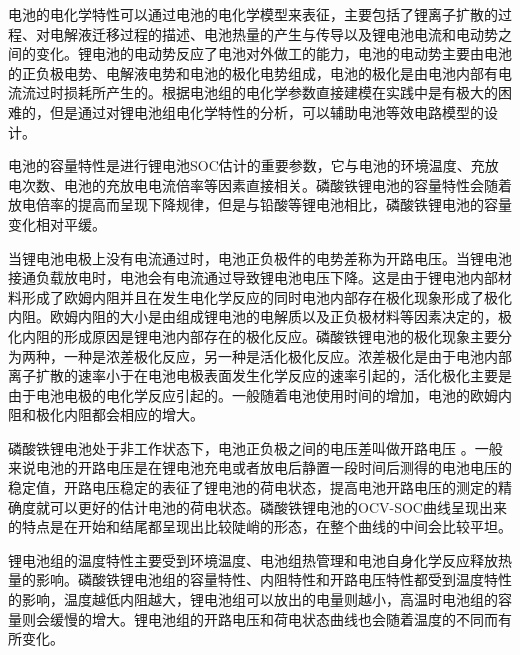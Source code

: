 	电池的电化学特性可以通过电池的电化学模型来表征，主要包括了锂离子扩散的过程、对电解液迁移过程的描述、电池热量的产生与传导以及锂电池电流和电动势之间的变化。锂电池的电动势反应了电池对外做工的能力，电池的电动势主要由电池的正负极电势、电解液电势和电池的极化电势组成，电池的极化是由电池内部有电流流过时损耗所产生的。根据电池组的电化学参数直接建模在实践中是有极大的困难的，但是通过对锂电池组电化学特性的分析，可以辅助电池等效电路模型的设计。
\begin{enumerate}

	电池的容量特性是进行锂电池SOC估计的重要参数，它与电池的环境温度、充放电次数、电池的充放电电流倍率等因素直接相关。磷酸铁锂电池的容量特性会随着放电倍率的提高而呈现下降规律，但是与铅酸等锂电池相比，磷酸铁锂电池的容量变化相对平缓。

	当锂电池电极上没有电流通过时，电池正负极件的电势差称为开路电压。当锂电池接通负载放电时，电池会有电流通过导致锂电池电压下降。这是由于锂电池内部材料形成了欧姆内阻并且在发生电化学反应的同时电池内部存在极化现象形成了极化内阻。欧姆内阻的大小是由组成锂电池的电解质以及正负极材料等因素决定的，极化内阻的形成原因是锂电池内部存在的极化反应。磷酸铁锂电池的极化现象主要分为两种，一种是浓差极化反应，另一种是活化极化反应。浓差极化是由于电池内部 离子扩散的速率小于在电池电极表面发生化学反应的速率引起的，活化极化主要是由于电池电极的电化学反应引起的。一般随着电池使用时间的增加，电池的欧姆内阻和极化内阻都会相应的增大。

	磷酸铁锂电池处于非工作状态下，电池正负极之间的电压差叫做开路电压 。一般来说电池的开路电压是在锂电池充电或者放电后静置一段时间后测得的电池电压的稳定值，开路电压稳定的表征了锂电池的荷电状态，提高电池开路电压的测定的精确度就可以更好的估计电池的荷电状态。磷酸铁锂电池的OCV-SOC曲线呈现出来的特点是在开始和结尾都呈现出比较陡峭的形态，在整个曲线的中间会比较平坦。

	锂电池组的温度特性主要受到环境温度、电池组热管理和电池自身化学反应释放热量的影响。磷酸铁锂电池组的容量特性、内阻特性和开路电压特性都受到温度特性的影响，温度越低内阻越大，锂电池组可以放出的电量则越小，高温时电池组的容量则会缓慢的增大。锂电池组的开路电压和荷电状态曲线也会随着温度的不同而有所变化。
\end{enumerate}
